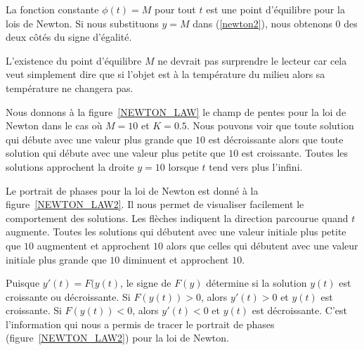 {\begin{egg}
La fonction constante $\phi(t) = M$ pour tout $t$ est une point
d'équilibre pour la lois de Newton.  Si nous substituons $y = M$ dans
(\ref{newton2}), nous obtenons $0$ des deux côtés du signe d'égalité.

L'existence du point d'équilibre $M$ ne devrait pas surprendre le
lecteur car cela veut simplement dire que si l'objet est à la
température du milieu alors sa température ne changera pas.

Nous donnons à la figure~\ref{NEWTON_LAW} le champ de pentes pour la loi
de Newton dans le cas où $M=10$ et $K=0.5$.  Nous pouvons voir que toute
solution qui débute avec une valeur plus grande que $10$ est
décroissante alors que toute solution qui débute avec une valeur plus
petite que $10$ est croissante. Toutes les solutions approchent la
droite $y=10$ lorsque $t$ tend vers plus l'infini.

Le portrait de phases pour la loi de Newton est donné à la
figure~\ref{NEWTON_LAW2}.  Il nous permet de visualiser facilement le
comportement des solutions.  Les flèches indiquent la direction
parcourue quand $t$ augmente.  Toutes les solutions qui débutent avec
une valeur initiale plus petite que $10$ augmentent et approchent $10$
alors que celles qui débutent avec une valeur initiale plus grande que
$10$ diminuent et approchent $10$.

Puisque $y'(t) = F(y(t)$, le signe de $F(y)$ détermine si la solution
$y(t)$ est croissante ou décroissante.  Si $F(y(t))>0$, alors $y'(t)>0$ et
$y(t)$ est croissante.   Si $F(y(t))<0$, alors $y'(t)<0$ et $y(t)$ est
décroissante.  C'est l'information qui nous a permis de tracer
le portrait de phases (figure~\ref{NEWTON_LAW2}) pour la loi de Newton.
\label{egg2_newton_law}
\end{egg}



}
